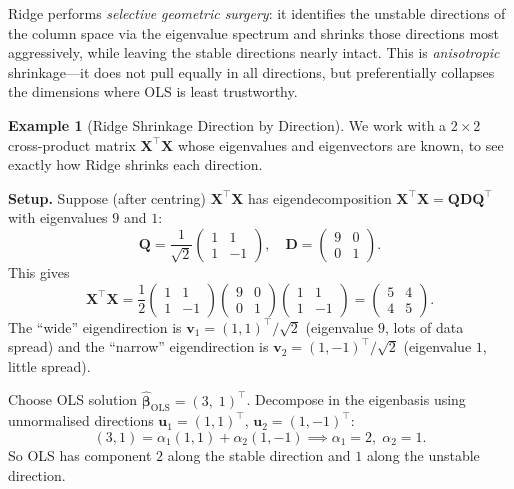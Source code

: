 \documentclass[11pt,a4paper]{article}
\theoremstyle{plain}
\theoremstyle{definition}
\newtheorem{example}[theorem]{Example}
\newcommand{\bhat}{\hat{\bm{\beta}}}
\newcommand{\bX}{\bm{X}}
\newcommand{\bQ}{\bm{Q}}
\newcommand{\bD}{\bm{D}}
\begin{document}
\begin{keyinsight}
Ridge performs \emph{selective geometric surgery}: it identifies the
unstable directions of the column space via the eigenvalue spectrum
and shrinks those directions most aggressively, while leaving the
stable directions nearly intact.
This is \emph{anisotropic} shrinkage---it does not pull equally in
all directions, but preferentially collapses the dimensions where OLS
is least trustworthy.
\end{keyinsight}



\begin{example}[Ridge Shrinkage Direction by Direction]\label{ex:ridge}
We work with a $2\times 2$ cross-product matrix $\bX^\top\bX$ whose
eigenvalues and eigenvectors are known, to see exactly how Ridge shrinks
each direction.

\medskip\noindent\textbf{Setup.}
Suppose (after centring) $\bX^\top\bX$ has eigendecomposition
$\bX^\top\bX = \bQ\bD\bQ^\top$ with eigenvalues $9$ and $1$:
\[
\bQ = \frac{1}{\sqrt{2}}\begin{pmatrix}1&1\\1&-1\end{pmatrix},\quad
\bD = \begin{pmatrix}9&0\\0&1\end{pmatrix}.
\]
This gives
\[
\bX^\top\bX
= \frac{1}{2}\begin{pmatrix}1&1\\1&-1\end{pmatrix}
\begin{pmatrix}9&0\\0&1\end{pmatrix}
\begin{pmatrix}1&1\\1&-1\end{pmatrix}
= \begin{pmatrix}5&4\\4&5\end{pmatrix}.
\]
The ``wide'' eigendirection is
$\bm{v}_1 = (1,1)^\top/\sqrt{2}$ (eigenvalue $9$, lots of data spread)
and the ``narrow'' eigendirection is
$\bm{v}_2 = (1,-1)^\top/\sqrt{2}$ (eigenvalue $1$, little spread).

Choose OLS solution $\bhat_{\text{OLS}} = (3,\;1)^\top$.
Decompose in the eigenbasis using unnormalised directions
$\bm{u}_1 = (1,1)^\top$, $\bm{u}_2 = (1,-1)^\top$:
\[
(3,1) = \alpha_1(1,1) + \alpha_2(1,-1)
\implies \alpha_1 = 2,\;\alpha_2 = 1.
\]
So OLS has component $2$ along the stable direction and $1$ along
the unstable direction.


\end{example}
\end{document}
